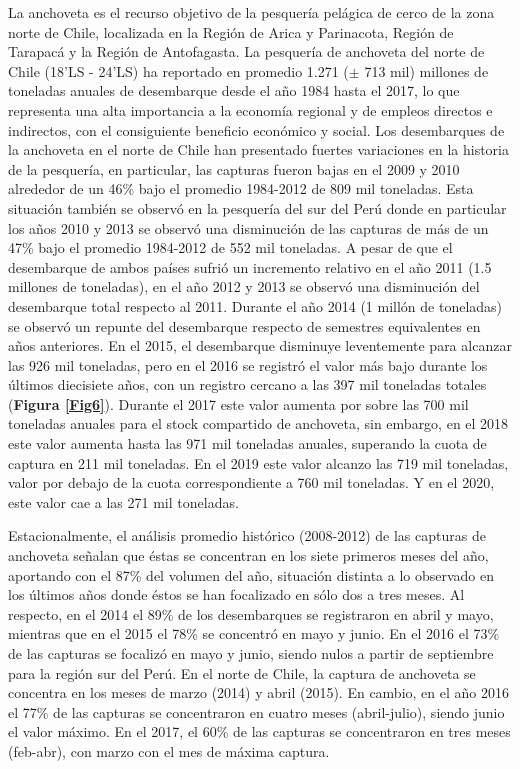 \documentclass[letter,11pt]{article}
\begin{document}
La anchoveta es el recurso objetivo de la pesquer\'ia pel\'agica de cerco de
la zona norte de Chile, localizada en la Regi\'on de Arica y Parinacota,
Regi\'on de Tarapac\'a y la Regi\'on de Antofagasta. La pesquer\'ia de anchoveta
del norte de Chile (18'LS - 24'LS) ha reportado en
promedio 1.271 ($\pm$ 713 mil) millones de toneladas anuales de
desembarque desde el a\~{n}o 1984 hasta el 2017, lo que representa una alta
importancia a la econom\'ia regional y de empleos directos e indirectos,
con el consiguiente beneficio econ\'omico y social. Los desembarques de la
anchoveta en el norte de Chile han presentado fuertes variaciones en la
historia de la pesquer\'ia, en particular, las capturas fueron bajas en el
2009 y 2010 alrededor de un 46\% bajo el promedio 1984-2012 de 809 mil
toneladas. Esta situaci\'on tambi\'en se observ\'o en la pesquer\'ia del sur del
Per\'u donde en particular los a\~{n}os 2010 y 2013 se observ\'o una disminuci\'on
de las capturas de m\'as de un 47\% bajo el promedio 1984-2012 de 552 mil
toneladas. A pesar de que el desembarque de ambos pa\'ises sufri\'o un
incremento relativo en el a\~{n}o 2011 (1.5 millones de toneladas), en el
a\~{n}o 2012 y 2013 se observ\'o una disminuci\'on del desembarque total
respecto al 2011. Durante el a\~{n}o 2014 (1 mill\'on de toneladas) se observ\'o
un repunte del desembarque respecto de semestres equivalentes en a\~{n}os
anteriores. En el 2015, el desembarque disminuye leventemente para
alcanzar las 926 mil toneladas, pero en el 2016 se registr\'o el valor m\'as
bajo durante los \'ultimos diecisiete a\~{n}os, con un registro cercano a las
397 mil toneladas totales (\textbf{Figura \ref{Fig6}}). Durante el 2017
este valor aumenta por sobre las 700 mil toneladas anuales para el stock
compartido de anchoveta, sin embargo, en el 2018 este valor aumenta
hasta las 971 mil toneladas anuales, superando la cuota de captura en
211 mil toneladas. En el 2019 este valor alcanzo las 719 mil toneladas,
valor por debajo de la cuota correspondiente a 760 mil toneladas. Y en
el 2020, este valor cae a las 271 mil toneladas.

Estacionalmente, el an\'alisis promedio hist\'orico (2008-2012) de las
capturas de anchoveta se\~{n}alan que \'estas se concentran en los siete
primeros meses del a\~{n}o, aportando con el 87\% del volumen del a\~{n}o,
situaci\'on distinta a lo observado en los \'ultimos a\~{n}os donde \'estos se han
focalizado en s\'olo dos a tres meses. Al respecto, en el 2014 el 89\% de
los desembarques se registraron en abril y mayo, mientras que en el 2015
el 78\% se concentr\'o en mayo y junio. En el 2016 el 73\% de las capturas
se focaliz\'o en mayo y junio, siendo nulos a partir de septiembre para la
regi\'on sur del Per\'u. En el norte de Chile, la captura de anchoveta se
concentra en los meses de marzo (2014) y abril (2015). En cambio, en el
a\~{n}o 2016 el 77\% de las capturas se concentraron en cuatro meses
(abril-julio), siendo junio el valor m\'aximo. En el 2017, el 60\% de las
capturas se concentraron en tres meses (feb-abr), con marzo con el mes
de m\'axima captura.
\end{document}
